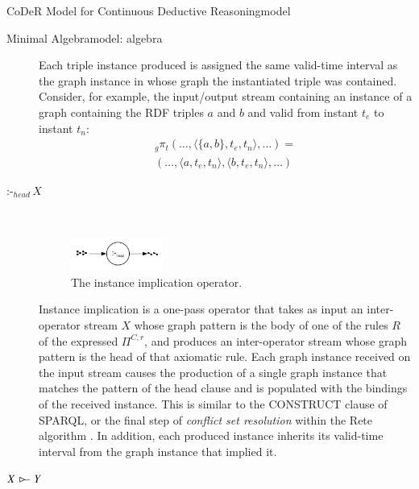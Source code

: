 \begin{nestedsection}{CoDeR Model for Continuous Deductive Reasoning}{model}
\begin{nestedsection}{Minimal Algebra}{model: algebra}
\begin{description}
				Each triple instance produced is assigned the same valid-time interval as the graph instance in whose graph the instantiated triple was contained.
				Consider, for example, the input/output stream containing an instance of a graph containing the RDF triples $a$ and $b$ and valid from instant $t_e$ to instant $t_n$:
				\begin{multline*}
					{}_g{\pi_t} (\dots,\langle \{a,b\},t_e,t_n \rangle,\dots) = \\
						(\dots,\langle a,t_e,t_n \rangle,\langle b,t_e,t_n \rangle,\dots)
				\end{multline*}
			\item[$\text{:-}_{head}\,X$] \hfill \\
				\begin{figure}[b]
					\centering
					\includegraphics[width=0.3\textwidth]{instance-implication}
					\caption{The instance implication operator.}
				\end{figure}
				Instance implication is a one-pass operator that takes as input an inter-operator stream $X$ whose graph pattern is the body of one of the rules $R$ of the expressed $\Pi^{C,r}$, and produces an inter-operator stream whose graph pattern is the head of that axiomatic rule.
				Each graph instance received on the input stream causes the production of a single graph instance that matches the pattern of the head clause and is populated with the bindings of the received instance.
				This is similar to the CONSTRUCT clause of SPARQL, or the final step of \emph{conflict set resolution} within the Rete algorithm \citep{forgy79}.
				In addition, each produced instance inherits its valid-time interval from the graph instance that implied it.
			\item[${X\,\rstreamjoin\,Y}$] \hfill \\
				\begin{figure}[t]
					\centering
					\\

\end{figure}
\end{description}
\end{nestedsection}
\end{nestedsection}
